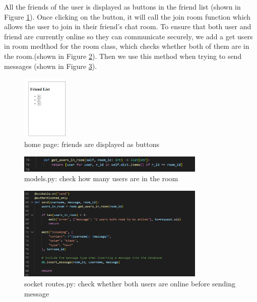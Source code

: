 \documentclass[12pt]{article}
\begin{document}
        All the friends of the user is displayed as buttons in the friend list (shown in Figure \ref{friendlist}).  Once clicking on the button, it will call the join room function which allows the user to join in their friend's chat room.  To ensure that both user and friend are currently online so they can communicate securely, we add a get users in room medthod for the room class, which checks whether both of them are in the room.(shown in Figure \ref{getusersinroom}). Then we use this method when trying to send messages (shown in Figure \ref{send}).


        \begin{figure}[H]
                \centering
                \includegraphics[width=0.2\textwidth]{zzrgraphs/friend_list.png}
                \caption{home page: friends are displayed as buttons}
                \label{friendlist}
            \end{figure}

        \begin{figure}[H]
            \centering
            \includegraphics[width=0.8\textwidth]{zzrgraphs/models_get_users_in_room.png}
            \caption{models.py: check how many users are in the room}
            \label{getusersinroom}
        \end{figure} 


        \begin{figure}[H]
            \centering
            \includegraphics[width=0.8\textwidth]{zzrgraphs/socket_send.png}
            \caption{socket routes.py: check whether both users are online before sending message}
            \label{send}
        \end{figure}  
\end{document}
